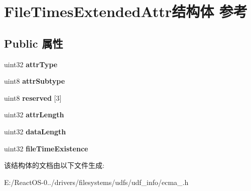 \hypertarget{struct_file_times_extended_attr}{}\section{File\+Times\+Extended\+Attr结构体 参考}
\label{struct_file_times_extended_attr}
\subsection*{Public 属性}
\begin{DoxyCompactItemize}
\item 
\mbox{\label{struct_file_times_extended_attr_ae4e0535b33f9d4bb6ded06a6886524a9}} 
uint32 {\bfseries attr\+Type}
\item 
\mbox{\label{struct_file_times_extended_attr_ab12a71fe2b383aa2cab5525b2d3cb4e5}} 
uint8 {\bfseries attr\+Subtype}
\item 
\mbox{\label{struct_file_times_extended_attr_ac637d11f873f171228955354bdeb32a7}} 
uint8 {\bfseries reserved} \mbox{[}3\mbox{]}
\item 
\mbox{\label{struct_file_times_extended_attr_a51d2916aa9813fbb34d1d566bb038d07}} 
uint32 {\bfseries attr\+Length}
\item 
\mbox{\label{struct_file_times_extended_attr_ad269f49459a30b0483e4e81c3b54ff59}} 
uint32 {\bfseries data\+Length}
\item 
\mbox{\label{struct_file_times_extended_attr_a4557d5db2d47e1ed8468013eda67e848}} 
uint32 {\bfseries file\+Time\+Existence}
\end{DoxyCompactItemize}


该结构体的文档由以下文件生成\+:\begin{DoxyCompactItemize}
\item 
E\+:/\+React\+O\+S-\/0../drivers/filesystems/udfs/udf\+\_\+info/ecma\+\_.\+h\end{DoxyCompactItemize}
